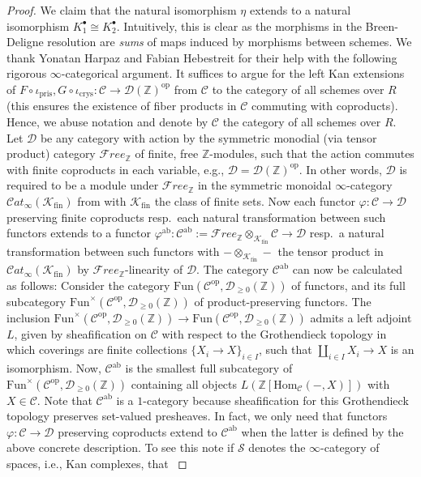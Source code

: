 \documentclass{amsart}
\theoremstyle{plain}
\theoremstyle{definition}
\newcommand{\crys}{\mathrm{crys}}
\newcommand{\pris}{\mathrm{pris}}
\newcommand{\Z}{\mathbb{Z}}
\newcommand{\red}[1]{{\color{black} #1}}
\newcommand{\green}[1]{{\color{black}#1}}
\begin{document}
\begin{proof}
{    We claim that the natural isomorphism $\eta$ extends to a natural isomorphism $K_1^\bullet\cong K_2^\bullet$.
  }
  \red{   
    Intuitively, this is clear as the morphisms in the Breen-Deligne resolution are \textit{sums} of maps induced by morphisms between schemes. We thank Yonatan Harpaz and Fabian Hebestreit for their help with the following rigorous $\infty$-categorical argument. It suffices to argue for the left Kan extensions of $F\circ \iota_\pris, G\circ \iota_\crys\colon \mathcal{C}\to \mathcal{D}(\Z)^{\mathrm{op}}$ from $\mathcal{C}$ to the category of all schemes over $R$ (this ensures the existence of fiber products in $\mathcal{C}$ commuting with coproducts). Hence, we abuse notation and denote by $\mathcal{C}$ the category of all schemes over $R$. Let $\mathcal{D}$ be any category with action by the symmetric monodial (via tensor product) category $\mathcal{F}ree_\Z$ of finite, free $\Z$-modules, such that the action commutes with finite coproducts in each variable, e.g., $\mathcal{D}=\mathcal{D}(\Z)^{\mathrm{op}}$. In other words, $\mathcal{D}$ is required to be a module under $\mathcal{F}ree_\Z$ in the symmetric monoidal $\infty$-category $\mathcal{C}at_{\infty}(\mathcal{K}_{\mathrm{fin}})$ from \cite[Corollary 4.8.1.4]{lurie_higher_algebra} with $\mathcal{K}_{\mathrm{fin}}$ the class of finite sets. Now each functor $\varphi\colon \mathcal{C}\to \mathcal{D}$ preserving finite coproducts resp.\ each natural transformation between such functors extends to a functor $\varphi^{\mathrm{ab}}\colon \mathcal{C}^{\mathrm{ab}}:=\mathcal{F}ree_{\Z}\otimes_{\mathcal{K}_{\mathrm{fin}}} \mathcal{C}\to \mathcal{D}$ resp.\ a natural transformation between such functors with $-\otimes_{\mathcal{K}_{\mathrm{fin}}}-$ the tensor product in $\mathcal{C}at_{\infty}(\mathcal{K}_{\mathrm{fin}})$ by $\mathcal{F}ree_\Z$-linearity of $\mathcal{D}$. The category $\mathcal{C}^{\mathrm{ab}}$ can now be calculated as follows: Consider the category $\mathrm{Fun}(\mathcal{C}^{\mathrm{op}},\mathcal{D}_{\geq 0}(\Z))$ of functors, and its full subcategory $\mathrm{Fun}^{\times}(\mathcal{C}^{\mathrm{op}},\mathcal{D}_{\geq 0}(\Z))$ of product-preserving functors. The inclusion $\mathrm{Fun}^{\times}(\mathcal{C}^{\mathrm{op}},\mathcal{D}_{\geq 0}(\Z))\to \mathrm{Fun}(\mathcal{C}^{\mathrm{op}},\mathcal{D}_{\geq 0}(\Z))$ admits a left adjoint $L$, given by sheafification on $\mathcal{C}$ with respect to the Grothendieck topology in which coverings are finite collections $\{X_i\to X\}_{i\in I}$, such that $\coprod\limits_{i\in I} X_i\to X$ is an isomorphism. Now, $\mathcal{C}^{\mathrm{ab}}$ is the smallest full subcategory of $\mathrm{Fun}^{\times}(\mathcal{C}^{\mathrm{op}},\mathcal{D}_{\geq 0}(\Z))$ containing all objects $L(\Z[\mathrm{Hom}_{\mathcal{C}}(-,X)])$ with $X\in \mathcal{C}$. Note that $\mathcal{C}^{\mathrm{ab}}$ is a $1$-category because sheafification for \green{this} Grothendieck topology preserves set-valued presheaves. In fact, we only need that functors $\varphi\colon \mathcal{C}\to \mathcal{D}$ preserving coproducts extend to $\mathcal{C}^{\mathrm{ab}}$ when the latter is defined by the above concrete description. To see this note if $\mathcal{S}$ denotes the $\infty$-category of spaces, i.e., Kan complexes, that
}
\end{proof}
\end{document}
